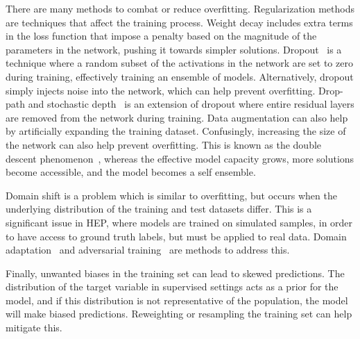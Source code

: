 There are many methods to combat or reduce overfitting.
Regularization methods are techniques that affect the training process.
Weight decay includes extra terms in the loss function that impose a penalty based on the magnitude of the parameters in the network, pushing it towards simpler solutions.
Dropout~\cite{Dropout} is a technique where a random subset of the activations in the network are set to zero during training, effectively training an ensemble of models.
Alternatively, dropout simply injects noise into the network, which can help prevent overfitting.
Drop-path and stochastic depth~\cite{DeepNetworksStochastic} is an extension of dropout where entire residual layers are removed from the network during training.
Data augmentation can also help by artificially expanding the training dataset.
Confusingly, increasing the size of the network can also help prevent overfitting.
This is known as the double descent phenomenon~\cite{UnderstandingDoubleDescent}, whereas the effective model capacity grows, more solutions become accessible, and the model becomes a self ensemble.

Domain shift is a problem which is similar to overfitting, but occurs when the underlying distribution of the training and test datasets differ.
This is a significant issue in \Gls{HEP}, where models are trained on simulated samples, in order to have access to ground truth labels, but must be applied to real data.
Domain adaptation~\cite{UnsupervisedDomainAdaptation} and adversarial training~\cite{EnhancingGeneralizationHigh} are methods to address this.

Finally, unwanted biases in the training set can lead to skewed predictions.
The distribution of the target variable in supervised settings acts as a prior for the model, and if this distribution is not representative of the population, the model will make biased predictions.
Reweighting or resampling the training set can help mitigate this.
